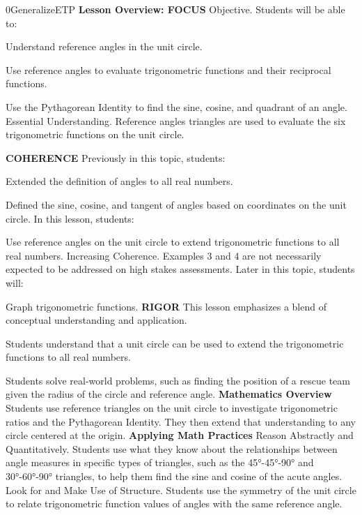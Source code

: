 \documentclass{article}
\newenvironment{te-addendum}[2]{}{}     %
\newcommand{\te}[1]{}                   %
\begin{document}
\begin{te-addendum}{0}{GeneralizeETP}
\textbf{Lesson Overview: FOCUS}
Objective. Students will be able to:
\item Understand reference angles in the unit circle.
\item Use reference angles to evaluate trigonometric functions and their reciprocal functions.
\item Use the Pythagorean Identity to find the sine, cosine, and quadrant of an angle.
Essential Understanding. Reference angles triangles are used to evaluate the six trigonometric functions on the unit circle.
\te{Printed ``Reference angles triangles''; likely ``Reference triangles''.}
\textbf{COHERENCE}
Previously in this topic, students:
\item Extended the definition of angles to all real numbers.
\item Defined the sine, cosine, and tangent of angles based on coordinates on the unit circle.
In this lesson, students:
\item Use reference angles on the unit circle to extend trigonometric functions to all real numbers.
Increasing Coherence. Examples 3 and 4 are not necessarily expected to be addressed on high stakes assessments.
Later in this topic, students will:
\item Graph trigonometric functions.
\textbf{RIGOR}
This lesson emphasizes a blend of conceptual understanding and application.
\item Students understand that a unit circle can be used to extend the trigonometric functions to all real numbers.
\item Students solve real-world problems, such as finding the position of a rescue team given the radius of the circle and reference angle.
\textbf{Mathematics Overview}
Students use reference triangles on the unit circle to investigate trigonometric ratios and the Pythagorean Identity. They then extend that understanding to any circle centered at the origin.
\textbf{Applying Math Practices}
Reason Abstractly and Quantitatively. Students use what they know about the relationships between angle measures in specific types of triangles, such as the 45°-45°-90° and 30°-60°-90° triangles, to help them find the sine and cosine of the acute angles.
Look for and Make Use of Structure. Students use the symmetry of the unit circle to relate trigonometric function values of angles with the same reference angle.
\end{te-addendum}
\end{document}

